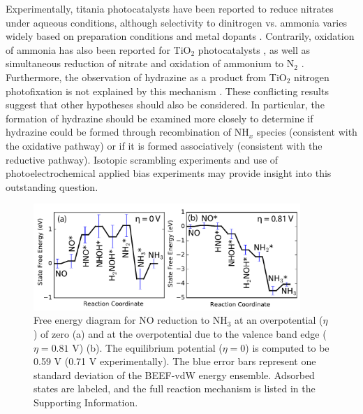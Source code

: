 \documentclass[journal=ascecg,manuscript=article,articletitle=true]{achemso}
\begin{document}

Experimentally, titania photocatalysts have been reported to reduce nitrates under aqueous conditions, although selectivity to dinitrogen vs. ammonia varies widely based on preparation conditions and metal dopants \cite{Kobwittaya_2014, Kominami_2010, Ranjit_1997,Shand_2013,Xie_2017,Lozovskii_2009}. Contrarily, oxidation of ammonia has also been reported for TiO$_2$ photocatalysts \cite{Pollema_1992, Wang_1994, Kominami_2014}, as well as simultaneous reduction of nitrate and oxidation of ammonium to N$_2$ \cite{Kominami_2014}. Furthermore, the observation of hydrazine as a product from TiO$_2$ nitrogen photofixation is not explained by this mechanism \cite{Schrauzer_2011}. These conflicting results suggest that other hypotheses should also be considered. In particular, the formation of hydrazine should be examined more closely to determine if hydrazine could be formed through recombination of NH$_x$ species (consistent with the oxidative pathway) or if it is formed associatively (consistent with the reductive pathway). Isotopic scrambling experiments\cite{Urabe_1978} and use of photoelectrochemical applied bias experiments may provide insight into this outstanding question.

\begin{figure}
\includegraphics[width=0.9\textwidth]{figures/NO_reduction_FED.pdf}
\caption{Free energy diagram for NO reduction to NH$_3$ at an overpotential ($\eta$) of zero (a) and at the overpotential due to the valence band edge ($\eta=0.81$ V) (b). The equilibrium potential ($\eta=0$) is computed to be 0.59 V (0.71 V experimentally). The blue error bars represent one standard deviation of the BEEF-vdW energy ensemble. Adsorbed states are labeled, and the full reaction mechanism is listed in the Supporting Information.}
\label{fig:FED_oxid_red}
\end{figure}
\end{document}
